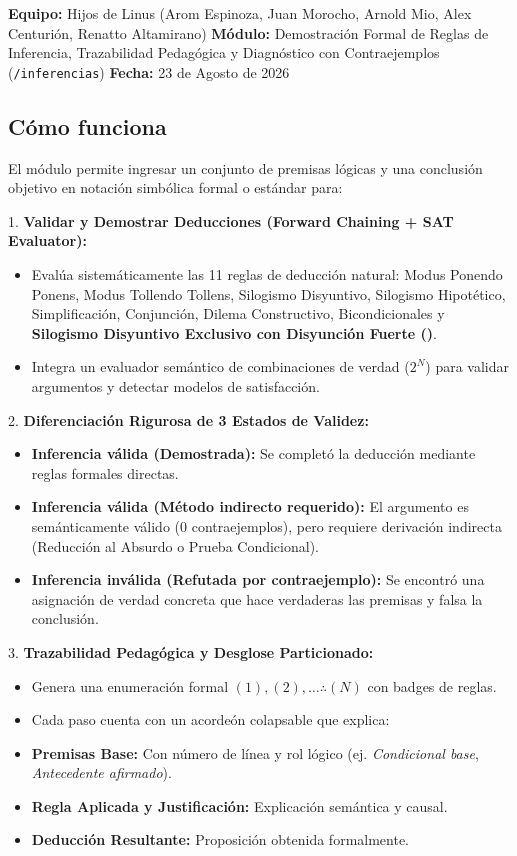 \documentclass[11pt,a4paper,openany]{book}
\begin{document}
\textbf{Equipo:} Hijos de Linus (Arom Espinoza, Juan Morocho, Arnold Mio, Alex Centurión, Renatto Altamirano)
\textbf{Módulo:} Demostración Formal de Reglas de Inferencia, Trazabilidad Pedagógica y Diagnóstico con Contraejemplos (\texttt{/inferencias})
\textbf{Fecha:} 23 de Agosto de 2026

\hrulefill

\subsection{Cómo funciona}

El módulo permite ingresar un conjunto de premisas lógicas y una conclusión objetivo en notación simbólica formal o estándar para:

1. \textbf{Validar y Demostrar Deducciones (Forward Chaining + SAT Evaluator):}
\begin{itemize}[leftmargin=*]
\item Evalúa sistemáticamente las 11 reglas de deducción natural: Modus Ponendo Ponens, Modus Tollendo Tollens, Silogismo Disyuntivo, Silogismo Hipotético, Simplificación, Conjunción, Dilema Constructivo, Bicondicionales y \textbf{Silogismo Disyuntivo Exclusivo con Disyunción Fuerte (\texttt{})}.
\item Integra un evaluador semántico de combinaciones de verdad ($2^N$) para validar argumentos y detectar modelos de satisfacción.
\end{itemize}

2. \textbf{Diferenciación Rigurosa de 3 Estados de Validez:}
\begin{itemize}[leftmargin=*]
\item \textbf{Inferencia válida (Demostrada):} Se completó la deducción mediante reglas formales directas.
\item \textbf{Inferencia válida (Método indirecto requerido):} El argumento es semánticamente válido ($0$ contraejemplos), pero requiere derivación indirecta (Reducción al Absurdo o Prueba Condicional).
\item \textbf{Inferencia inválida (Refutada por contraejemplo):} Se encontró una asignación de verdad concreta que hace verdaderas las premisas y falsa la conclusión.
\end{itemize}

3. \textbf{Trazabilidad Pedagógica y Desglose Particionado:}
\begin{itemize}[leftmargin=*]
\item Genera una enumeración formal $(1), (2), \dots \therefore (N)$ con badges de reglas.
\item Cada paso cuenta con un acordeón colapsable que explica:
\item \textbf{Premisas Base:} Con número de línea y rol lógico (ej. \textit{Condicional base}, \textit{Antecedente afirmado}).
\item \textbf{Regla Aplicada y Justificación:} Explicación semántica y causal.
\item \textbf{Deducción Resultante:} Proposición obtenida formalmente.
\end{itemize}
\end{document}
